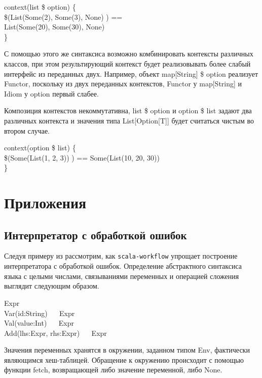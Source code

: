 \begin{haskell}
context(list \$ option) \{ \\
\quad\quad \$(List(Some(2), Some(3), None) ) == \\
\quad\quad\quad List(Some(20), Some(30), None) \\
\}
\end{haskell}

С помощью этого же синтаксиса возможно комбинировать контексты различных классов, при этом результирующий контекст будет реализовывать более слабый интерфейс из переданных двух. Например, объект \<map[String] \$ option\> реализует \<Functor\>, поскольку из двух переданных контекстов, \<Functor\> у \<map[String]\> и \<Idiom\> у \<option\> первый слабее.

Композиция контекстов некоммутативна, \<list \$ option\> и \<option \$ list\> задают два различных контекста и значения типа \<List[Option[T]]\> будет считаться чистым во втором случае.

\begin{haskell}
context(option \$ list) \{ \\
\quad\quad \$(Some(List(1, 2, 3)) ) == Some(List(10, 20, 30)) \\
\}
\end{haskell}

\section{Приложения}
\subsection{Интерпретатор с обработкой ошибок}
Следуя примеру из \cite{McBride2008} рассмотрим, как \texttt{scala-workflow} упрощает построение интерпретатора с обработкой ошибок. Определение абстрактного синтаксиса языка с целыми числами, связываниями переменных и операцией сложения выглядит следующим образом.

\begin{haskell}
  Expr \\
  Var(id:String) ~ ~Expr \\
  Val(value:Int) ~ ~Expr \\
  Add(lhs:Expr, rhs:Expr) ~ ~Expr
\end{haskell}

Значения переменных хранятся в окружении, заданном типом \<Env\>, фактически являющимся хеш-таблицей. Обращение к окружению происходит с помощью функции \<fetch\>, возвращающей либо значение переменной, либо \<None\>.

